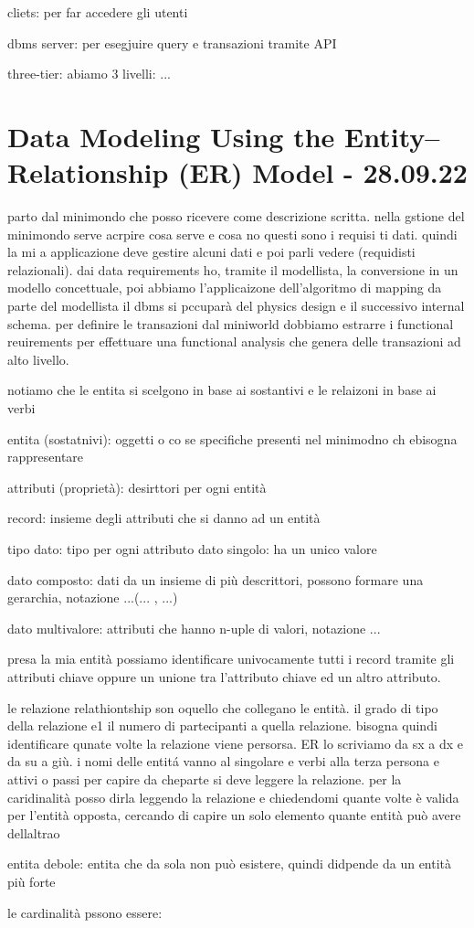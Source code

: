 cliets: per far accedere gli utenti

dbms server: per esegjuire query e transazioni tramite API 

three-tier: abiamo 3 livelli: ...





\section{Data Modeling Using the Entity–Relationship (ER) Model - 28.09.22}

parto dal minimondo che posso ricevere come descrizione scritta. nella gstione del minimondo serve acrpire cosa serve e cosa no questi sono i requisi ti dati. quindi la mi a applicazione deve gestire alcuni dati e poi parli vedere (requidisti relazionali). dai data requirements ho, tramite il modellista, la conversione in un modello concettuale, poi abbiamo l'applicaizone dell'algoritmo di mapping da parte del modellista il dbms si pccuparà del physics design e il successivo internal schema. per definire le transazioni dal miniworld dobbiamo estrarre i functional reuirements per effettuare una functional analysis che genera delle transazioni ad alto livello.


notiamo che le entita si scelgono in base ai sostantivi e le relaizoni in base ai verbi


entita (sostatnivi): oggetti o co se specifiche presenti nel minimodno ch ebisogna rappresentare

attributi (proprietà): desirttori per ogni entità

record: insieme degli attributi che si danno ad un entità

tipo dato: tipo per ogni attributo
	dato singolo: ha un unico valore
	
	dato composto: dati da un insieme di più descrittori, possono formare una gerarchia, notazione ...(... , ...)
	
	dato multivalore: attributi che hanno n-uple di valori, notazione {...}
	
	
presa la mia entità possiamo identificare univocamente tutti i record tramite gli attributi chiave oppure un unione tra l'attributo chiave ed un altro attributo.


le relazione relathiontship son oquello che collegano le entità. il grado di tipo della relazione e1 il numero di partecipanti a quella relazione. bisogna quindi identificare qunate volte la relazione viene persorsa. ER lo scriviamo da sx a dx e da su a giù. i nomi delle entitá vanno al singolare e verbi alla terza persona e attivi o passi per capire da cheparte si deve leggere la relazione. per la caridinalità posso dirla leggendo la relazione e chiedendomi quante volte è valida per l'entità opposta, cercando di capire un solo elemento  quante entità può avere dellaltrao



entita debole: entita che da sola non può esistere, quindi didpende da un entità più forte



le cardinalità pssono essere:
